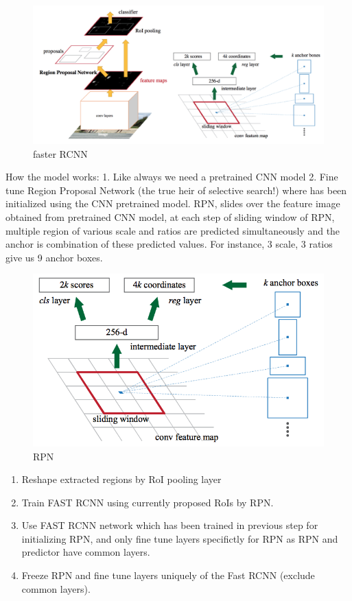 \documentclass[11pt]{article}
\makeatletter
\def\maxwidth{\ifdim\Gin@nat@width>\linewidth\linewidth
    \else\Gin@nat@width\fi}
\let\Oldincludegraphics\includegraphics
\renewcommand{\includegraphics}[1]{\Oldincludegraphics[width=.8\maxwidth]{#1}}
\providecommand{\tightlist}{%
      \setlength{\itemsep}{0pt}\setlength{\parskip}{0pt}}
\makeatother
\begin{document}
\begin{figure}
\centering
\includegraphics{wiki/faster1.png}
\caption{faster RCNN}
\end{figure}

How the model works: 1. Like always we need a pretrained CNN model 2.
Fine tune Region Proposal Network (the true heir of selective search!)
where has been initialized using the CNN pretrained model. RPN, slides
over the feature image obtained from pretrained CNN model, at each step
of sliding window of RPN, multiple region of various scale and ratios
are predicted simultaneously and the anchor is combination of these
predicted values. For instance, 3 scale, 3 ratios give us 9 anchor
boxes.

\begin{figure}
\centering
\includegraphics{wiki/faster4.png}
\caption{RPN}
\end{figure}

\begin{enumerate}
\def\labelenumi{\arabic{enumi}.}
\setcounter{enumi}{2}
\tightlist
\item
  Reshape extracted regions by RoI pooling layer
\item
  Train FAST RCNN using currently proposed RoIs by RPN.
\item
  Use FAST RCNN network which has been trained in previous step for
  initializing RPN, and only fine tune layers specifictly for RPN as RPN
  and predictor have common layers.
\item
  Freeze RPN and fine tune layers uniquely of the Fast RCNN (exclude
  common layers).
\end{enumerate}
\end{document}
